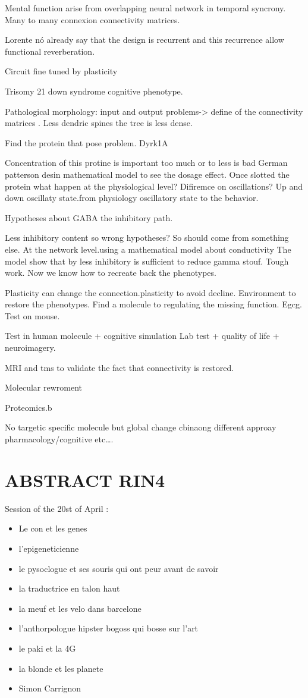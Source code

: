 \documentclass[10pt,letterpaper]{article}
\begin{document}
Mental function arise from overlapping neural network in temporal syncrony. Many to many connexion connectivity matrices.

Lorente nó already say that the design is recurrent and this recurrence allow functional reverberation.

Circuit fine tuned by plasticity

Trisomy 21 down syndrome cognitive phenotype.

Pathological morphology: input and output problems-> define of the connectivity matrices .
Less dendric spines the tree is less dense.

Find the protein that pose problem. Dyrk1A

Concentration of this protine is important too much or to less is bad
German patterson desin mathematical model to see the dosage effect.
Once slotted the protein what happen at the physiological level?
Difiremce on oscillations?
Up and down oscillaty state.from physiology oscillatory state to the behavior.

Hypotheses about GABA the inhibitory path.

Less inhibitory content so wrong hypotheses? So should come from something else.
At the network level.using a mathematical model about conductivity
The model show that by less inhibitory is sufficient to reduce gamma stouf. Tough work.
Now we know how to recreate back the phenotypes.

Plasticity can change the connection.plasticity to avoid decline. Environment to restore the phenotypes.
Find a molecule to regulating the missing function. Egcg. Test on mouse.

Test in human molecule + cognitive simulation
Lab test + quality of life + neuroimagery.

MRI and tms to validate the fact that connectivity is restored.

Molecular rewroment

Proteomics.b

No targetic specific molecule but global change cbinaong different approay pharmacology/cognitive etc\ldots.


\section{ABSTRACT RIN4}
Session of the 20st of April :

\begin{itemize}
    \item Le con et les genes
    \item l'epigeneticienne
    \item le pysoclogue et ses souris qui ont peur avant de savoir
    \item la traductrice en talon haut
    \item la meuf et les velo dans barcelone
    \item l'anthorpologue hipster bogoss qui bosse sur l'art
    \item le paki et la 4G
    \item la blonde et les planete
    \item Simon Carrignon
\end{itemize}
\end{document}
